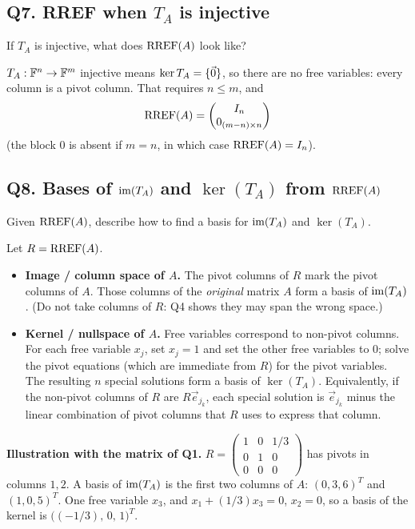 \subsection{Q7. RREF when $T_A$ is injective}

\begin{promptbox}
If $T_A$ is injective, what does $\operatorname{RREF}(A)$ look like?
\end{promptbox}

\begin{coursebox}
$T_A:\mathbb{F}^n\to\mathbb{F}^m$ injective means $\ker T_A=\{\vec{0}\}$, so there are no free
variables: every column is a pivot column. That requires $n\le m$, and
\[
\operatorname{RREF}(A)=\begin{pmatrix}I_n\\0_{(m-n)\times n}\end{pmatrix}
\]
(the block $0$ is absent if $m=n$, in which case $\operatorname{RREF}(A)=I_n$).
\end{coursebox}

\subsection{Q8. Bases of $\operatorname{im}(T_A)$ and $\ker(T_A)$ from $\operatorname{RREF}(A)$}

\begin{promptbox}
Given $\operatorname{RREF}(A)$, describe how to find a basis for $\operatorname{im}(T_A)$ and $\ker(T_A)$.
\end{promptbox}

\begin{coursebox}
Let $R=\operatorname{RREF}(A)$.
\begin{itemize}
\item \textbf{Image / column space of $A$.}
The pivot columns of $R$ mark the pivot columns of $A$. Those columns of the
\emph{original} matrix $A$ form a basis of $\operatorname{im}(T_A)$. (Do not take columns of
$R$: Q4 shows they may span the wrong space.)
\item \textbf{Kernel / nullspace of $A$.}
Free variables correspond to non-pivot columns. For each free variable $x_j$,
set $x_j=1$ and set the other free variables to $0$; solve the pivot equations
(which are immediate from $R$) for the pivot variables. The resulting $n$
special solutions form a basis of $\ker(T_A)$. Equivalently, if the non-pivot
columns of $R$ are $R\vec{e}_{j_k}$, each special solution is
$\vec{e}_{j_k}$ minus the linear combination of pivot columns that $R$ uses to
express that column.
\end{itemize}

\textbf{Illustration with the matrix of Q1.}
$R=\begin{pmatrix}1&0&1/3\\0&1&0\\0&0&0\end{pmatrix}$ has pivots in columns
$1,2$. A basis of $\operatorname{im}(T_A)$ is the first two columns of $A$:
$(0,3,6)^T$ and $(1,0,5)^T$. One free variable $x_3$, and
$x_1+(1/3)x_3=0$, $x_2=0$, so a basis of the kernel is
$\bigl((-1/3),\,0,\,1\bigr)^T$.
\end{coursebox}
